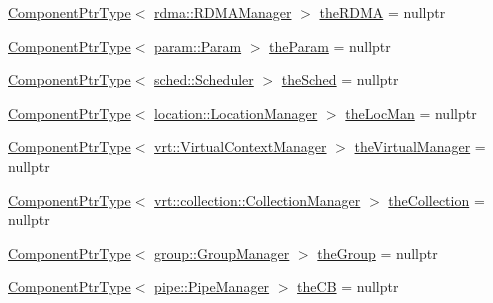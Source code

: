 \begin{DoxyCompactItemize}
\hyperlink{structvt_1_1runtime_1_1_runtime_a0893bf0a8c03b898e8ab66b52cec80ad}{Component\+Ptr\+Type}$<$ \hyperlink{structvt_1_1rdma_1_1_r_d_m_a_manager}{rdma\+::\+R\+D\+M\+A\+Manager} $>$ \hyperlink{structvt_1_1runtime_1_1_runtime_ab8ec604b336a974682b0fec124a4a31b}{the\+R\+D\+MA} = nullptr
\item 
\hyperlink{structvt_1_1runtime_1_1_runtime_a0893bf0a8c03b898e8ab66b52cec80ad}{Component\+Ptr\+Type}$<$ \hyperlink{structvt_1_1param_1_1_param}{param\+::\+Param} $>$ \hyperlink{structvt_1_1runtime_1_1_runtime_a3001881d47dc04ed4e77a1e183dd970e}{the\+Param} = nullptr
\item 
\hyperlink{structvt_1_1runtime_1_1_runtime_a0893bf0a8c03b898e8ab66b52cec80ad}{Component\+Ptr\+Type}$<$ \hyperlink{structvt_1_1sched_1_1_scheduler}{sched\+::\+Scheduler} $>$ \hyperlink{structvt_1_1runtime_1_1_runtime_ae9d0dc11ee40a455a64982eec66e3a26}{the\+Sched} = nullptr
\item 
\hyperlink{structvt_1_1runtime_1_1_runtime_a0893bf0a8c03b898e8ab66b52cec80ad}{Component\+Ptr\+Type}$<$ \hyperlink{structvt_1_1location_1_1_location_manager}{location\+::\+Location\+Manager} $>$ \hyperlink{structvt_1_1runtime_1_1_runtime_ae198134b20e8c3787f16f4e790f95d9a}{the\+Loc\+Man} = nullptr
\item 
\hyperlink{structvt_1_1runtime_1_1_runtime_a0893bf0a8c03b898e8ab66b52cec80ad}{Component\+Ptr\+Type}$<$ \hyperlink{structvt_1_1vrt_1_1_virtual_context_manager}{vrt\+::\+Virtual\+Context\+Manager} $>$ \hyperlink{structvt_1_1runtime_1_1_runtime_a85a0606ac06cd173561952676f09c077}{the\+Virtual\+Manager} = nullptr
\item 
\hyperlink{structvt_1_1runtime_1_1_runtime_a0893bf0a8c03b898e8ab66b52cec80ad}{Component\+Ptr\+Type}$<$ \hyperlink{structvt_1_1vrt_1_1collection_1_1_collection_manager}{vrt\+::collection\+::\+Collection\+Manager} $>$ \hyperlink{structvt_1_1runtime_1_1_runtime_a9c74bf08aceff27fa43330d3f1c8d581}{the\+Collection} = nullptr
\item 
\hyperlink{structvt_1_1runtime_1_1_runtime_a0893bf0a8c03b898e8ab66b52cec80ad}{Component\+Ptr\+Type}$<$ \hyperlink{structvt_1_1group_1_1_group_manager}{group\+::\+Group\+Manager} $>$ \hyperlink{structvt_1_1runtime_1_1_runtime_a0c446440cc8a67118f2ffd9de9f01be4}{the\+Group} = nullptr
\item 
\hyperlink{structvt_1_1runtime_1_1_runtime_a0893bf0a8c03b898e8ab66b52cec80ad}{Component\+Ptr\+Type}$<$ \hyperlink{structvt_1_1pipe_1_1_pipe_manager}{pipe\+::\+Pipe\+Manager} $>$ \hyperlink{structvt_1_1runtime_1_1_runtime_a8f4f5ea53aed7d2302bc52a39c16de0b}{the\+CB} = nullptr

\end{DoxyCompactItemize}
